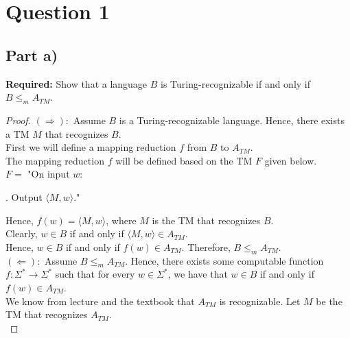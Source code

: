 \documentclass[12pt]{article}
\begin{document}

\setlength\parindent{0pt}

\section*{Question 1}

\subsection*{Part a)}

\textbf{Required:} Show that a language $B$ is Turing-recognizable if and only if $B \leq_m A_{TM}$. 

\begin{proof}

$(\Rightarrow):$ Assume $B$ is a Turing-recognizable language. Hence, there exists a TM $M$ that recognizes $B$. \\

First we will define a mapping reduction $f$ from $B$ to $A_{TM}$. \\

The mapping reduction $f$ will be defined based on the TM $F$ given below. \\

$F = $ "On input $w$: \\

\setlength\parindent{15pt}

. Output $\langle M, w \rangle$." \\

\setlength\parindent{0pt}

Hence, $f(w) = \langle M, w \rangle$, where $M$ is the TM that recognizes $B$. \\

Clearly, $w \in B$ if and only if $\langle M, w \rangle \in A_{TM}$. \\

Hence, $w \in B$ if and only if $f(w) \in A_{TM}$. Therefore, $B \leq_m A_{TM}$. \\

$(\Leftarrow):$ Assume $B \leq_m A_{TM}$. Hence, there exists some computable function $f: \Sigma^* \rightarrow \Sigma^*$ such that for every $w \in \Sigma^*$, we have that $w \in B$ if and only if $f(w) \in A_{TM}$. \\

We know from lecture and the textbook that $A_{TM}$ is recognizable. Let $M$ be the TM that recognizes $A_{TM}$. \\


\end{proof}
\end{document}
